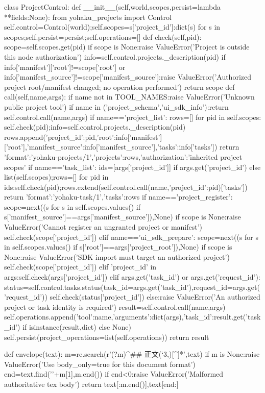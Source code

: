 class ProjectControl:
 def __init__(self,world,scopes,persist=lambda **fields:None):
  from yohaku_projects import Control
  self.control=Control(world);self.scopes={s['project_id']:dict(s) for s in scopes};self.persist=persist;self.operations=[]
 def check(self,pid):
  scope=self.scopes.get(pid)
  if scope is None:raise ValueError('Project is outside this node authorization')
  info=self.control.projects._description(pid)
  if info['manifest']['root']!=scope['root'] or info['manifest_source']!=scope['manifest_source']:raise ValueError('Authorized project root/manifest changed; no operation performed')
  return scope
 def call(self,name,args):
  if name not in TOOL_NAMES:raise ValueError('Unknown public project tool')
  if name in ('project_schema','ui_sdk_info'):return self.control.call(name,args)
  if name=='project_list':
   rows=[]
   for pid in self.scopes:
    self.check(pid);info=self.control.projects._description(pid)
    rows.append({'project_id':pid,'root':info['manifest']['root'],'manifest_source':info['manifest_source'],'tasks':info['tasks']})
   return {'format':'yohaku-projects/1','projects':rows,'authorization':'inherited project scopes'}
  if name=='task_list':
   ids=[args['project_id']] if args.get('project_id') else list(self.scopes);rows=[]
   for pid in ids:self.check(pid);rows.extend(self.control.call(name,{'project_id':pid})['tasks'])
   return {'format':'yohaku-task/1','tasks':rows}
  if name=='project_register':
   scope=next((s for s in self.scopes.values() if s['manifest_source']==args['manifest_source']),None)
   if scope is None:raise ValueError('Cannot register an ungranted project or manifest')
   self.check(scope['project_id'])
  elif name=='ui_sdk_prepare':
   scope=next((s for s in self.scopes.values() if s['root']==args['project_root']),None)
   if scope is None:raise ValueError('SDK import must target an authorized project')
   self.check(scope['project_id'])
  elif 'project_id' in args:self.check(args['project_id'])
  elif args.get('task_id') or args.get('request_id'):
   status=self.control.tasks.status(task_id=args.get('task_id'),request_id=args.get('request_id'))
   self.check(status['project_id'])
  else:raise ValueError('An authorized project or task identity is required')
  result=self.control.call(name,args)
  self.operations.append({'tool':name,'arguments':dict(args),'task_id':result.get('task_id') if isinstance(result,dict) else None})
  self.persist(project_operations=list(self.operations))
  return result

def envelope(text):
 m=re.search(r'(?m)^## 正文\s*\n(`{3,})[^\n]*\n',text)
 if m is None:raise ValueError('Use body_only=true for this document format')
 end=text.find('\n'+m[1],m.end())
 if end<0:raise ValueError('Malformed authoritative tex body')
 return text[:m.end()],text[end:]

